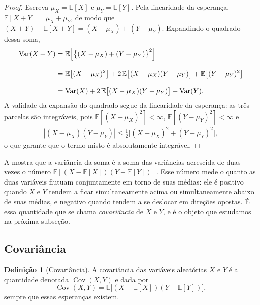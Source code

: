\documentclass[12pt,portuguese]{article}
\theoremstyle{definition}
\newtheorem{definition}[definition]{Definição}
\theoremstyle{plainexercise}
\theoremstyle{starredexercise}
\theoremstyle{definition}
\begin{document}
\begin{proof}
Escreva $\mu_X=\mathbb{E}[X]$ e $\mu_Y=\mathbb{E}[Y]$. Pela linearidade da
esperança, $\mathbb{E}[X+Y]=\mu_X+\mu_Y$, de modo que
$(X+Y)-\mathbb{E}[X+Y]=(X-\mu_X)+(Y-\mu_Y)$. Expandindo o quadrado dessa soma,
\begin{align*}
\operatorname{Var}(X+Y)
&= \mathbb{E}\Bigl[\bigl\{(X-\mu_X)+(Y-\mu_Y)\bigr\}^2\Bigr]
\\[0.3cm]
&= \mathbb{E}\bigl[(X-\mu_X)^2\bigr]
 +2\,\mathbb{E}\bigl[(X-\mu_X)(Y-\mu_Y)\bigr]
 +\mathbb{E}\bigl[(Y-\mu_Y)^2\bigr]
\\[0.3cm]
&= \operatorname{Var}(X)
 +2\,\mathbb{E}\bigl[(X-\mu_X)(Y-\mu_Y)\bigr]
 +\operatorname{Var}(Y).
\end{align*}
A validade da expansão do quadrado segue da linearidade da esperança: as três
parcelas são integráveis, pois $\mathbb{E}[(X-\mu_X)^2]<\infty$,
$\mathbb{E}[(Y-\mu_Y)^2]<\infty$ e 
\begin{align*}
|(X-\mu_X)(Y-\mu_Y)|\leqslant \tfrac12\bigl[(X-\mu_X)^2+(Y-\mu_Y)^2\bigr], 
\end{align*}
o que garante que o termo misto é
absolutamente integrável.
\end{proof}

A  mostra que a variância da soma é a soma das
variâncias acrescida de duas vezes o número
$\mathbb{E}[(X-\mathbb{E}[X])(Y-\mathbb{E}[Y])]$. Esse número mede o quanto as
duas variáveis flutuam conjuntamente em torno de suas médias: ele é positivo
quando $X$ e $Y$ tendem a ficar simultaneamente acima ou simultaneamente abaixo
de suas médias, e negativo quando tendem a se deslocar em direções opostas. É
essa quantidade que se chama \emph{covariância} de $X$ e $Y$, e é o objeto que
estudamos na próxima subseção.

\subsection{Covariância}\label{subsec:covariancia}

\begin{definition}[Covariância]\label{def:covariancia}
A covariância das variáveis aleatórias $X$ e $Y$ é a quantidade denotada
$\operatorname{Cov}(X,Y)$ e dada por
\begin{equation}\label{eq:cov-def}
\operatorname{Cov}(X,Y)=\mathbb{E}\bigl[(X-\mathbb{E}[X])(Y-\mathbb{E}[Y])\bigr],
\end{equation}
sempre que essas esperanças existem.
\end{definition}
\end{document}
